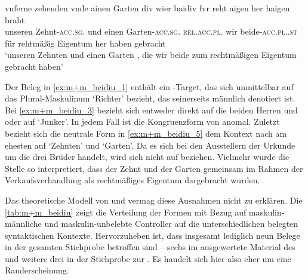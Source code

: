 \begin{exe}
\begin{xlist}
	\ex \label{ex:m+m_beidiu_5}
		\gll vnſerne zehenden \textelp{} vnde ainen Garten \textelp{} div wier
				baidiv fvr reht aigen her haigen~ braht \\
			unseren Zehnt-\textsc{acc.sg.\MascI} {} und einen
				Garten-\textsc{acc.sg.\MascI} {} \textsc{rel.acc.pl.\NeutI} wir
				beide-\textsc{acc.pl.\NeutI.st} für rehtmäßig Eigentum her
				haben gebracht \\
		\trans `unseren Zehnten \textelp{} und einen Garten \textelp{}, die wir
			beide zum rechtmäßigen Eigentum gebracht haben'
			\parencites(Nrn.~1201~AB, Kl.~Heiligkreuztal, Kr.~Biberach, 1290)[472,10--14]{cao2}

	\end{xlist}
\end{exe}

Der Beleg in \cref{ex:m+m_beidiu_1} enthält ein -Target, das sich
unmittelbar auf das Plural-Maskulinum  `Richter' bezieht, das
seinerseits männlich denotiert ist. Bei \cref{ex:m+m_beidiu_3} bezieht sich
 entweder direkt auf die beiden Herren
 und  oder auf
 `Junker'. In jedem Fall ist die Kongruenzform von 
anomal. Zuletzt bezieht sich die neutrale Form  in
\cref{ex:m+m_beidiu_5} dem Kontext nach am ehesten auf  `Zehnten'
und  `Garten'. Da es sich bei den Ausstellern der Urkunde um die
drei Brüder 
\autocites(Nrn.~1201~AB)[472,6--7]{cao2} handelt, wird sich  nicht
auf  beziehen. Vielmehr wurde die Stelle so interpretiert, dass der
Zehnt und der Garten gemeinsam im Rahmen der Verkaufsverhandlung als
rechtmäßiges Eigentum dargebracht wurden.

Das theoretische Modell von \citet{wechsler2009} und \citet{wechslerzlatic2003}
vermag diese Ausnahmen nicht zu erklären. Die \cref{tab:m+m_beidiu} zeigt die
Verteilung der Formen mit Bezug auf maskulin-männliche und maskulin-unbelebte
Controller auf die unterschiedlichen belegten syntaktischen Kontexte.
Hervorzuheben ist, dass insgesamt lediglich neun Belege in der gesamten
Stichprobe betroffen sind -- sechs im ausgewertete Material des \CAO{} und
weitere drei in der Stichprobe zur \KC{}. Es handelt sich hier also eher um
eine Randerscheinung.

